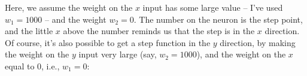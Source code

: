 \documentclass[a4paper,twoside,10pt]{book}
\begin{document}
\begin{center}
\end{center}
Here, we assume the weight on the $x$ input has some large value -- I've used $w_1=1000$ -- and the weight $w_2=0$. The number on the neuron is the step point, and the little $x$ above the number reminds us that the step is in the $x$ direction. Of course, it's also possible to get a step function in the $y$ direction, by making the weight on the $y$ input very large (say, $w_2=1000$), and the weight on the $x$ equal to 0, i.e., $w_1=0$:
\end{document}
